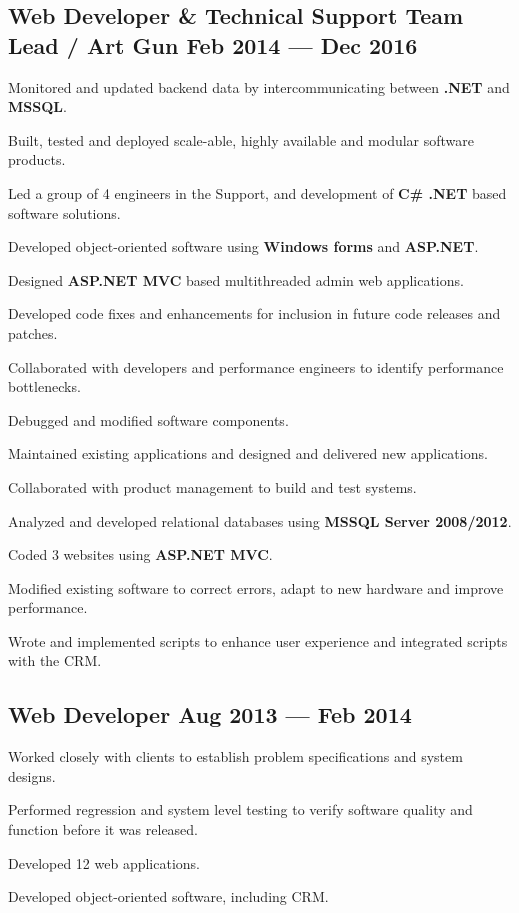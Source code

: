 \documentclass[letter,10pt]{article}
\begin{document}
\subsection{{Web Developer \& Technical Support Team Lead / Art Gun \hfill Feb 2014 --- Dec 2016}}
\begin{zitemize}
\item Monitored and updated back­end data by inter­communicating between \textbf{{.NET}} and \textbf{{MSSQL}}.
\item Built, tested and deployed scale-able, highly available and modular software products.
\item  Led a group of 4 engineers in the Support, and development of \textbf{{C\# .NET}} based software solutions.
\item  Developed object-oriented software using \textbf{{Windows forms}} and \textbf{{ASP.NET}}.
\item  Designed \textbf{{ASP.NET MVC}} based multi­threaded admin web applications.
\item  Developed code fixes and enhancements for inclusion in future code releases and patches.
\item  Collaborated with developers and performance engineers to identify performance bottlenecks.
\item  Debugged and modified software components.
\item  Maintained existing applications and designed and delivered new applications.
\item  Collaborated with product management to build and test systems.
\item  Analyzed and developed relational databases using \textbf{{MSSQL Server 2008/2012}}.
\item  Coded 3 websites using \textbf{{ASP.NET MVC}}.
\item  Modified existing software to correct errors, adapt to new hardware and improve performance.
\item  Wrote and implemented scripts to enhance user experience and integrated scripts with the CRM.

\end{zitemize}

\subsection{{Web Developer \hfill Aug 2013 --- Feb 2014}}
\begin{zitemize}
\item Worked closely with clients to establish problem specifications and system designs.
\item  Performed regression and system level testing to verify software quality and function before it was released.
\item  Developed 12 web applications.
\item  Developed object-oriented software, including CRM.

\end{zitemize}
\end{document}
